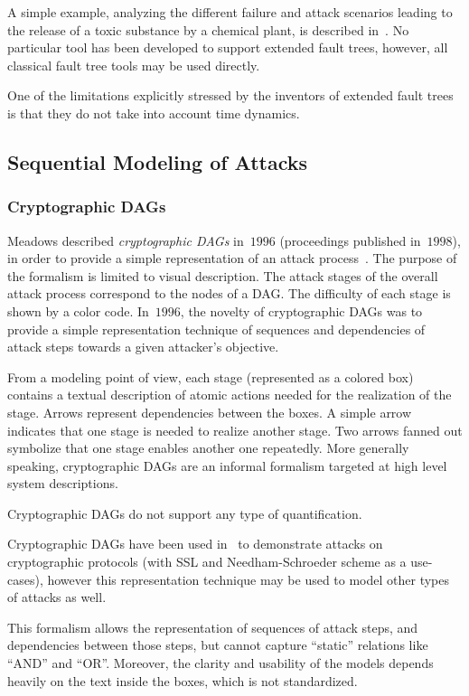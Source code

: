 \documentclass[a4paper]{article}
\begin{document}
A simple example, analyzing the different failure and attack scenarios leading
to the release of a toxic substance by a chemical plant, is described
in~\cite{FoMaCi}. No particular tool has been developed to support extended
fault trees, however, all classical fault tree tools may be used directly.

One of the limitations explicitly stressed by the inventors of extended fault
trees is that they do not take into account time dynamics. 

\subsection{Sequential Modeling of Attacks}
\label{sec:offensive_sequential}

\subsubsection{Cryptographic DAGs} 
\label{sec:cryptographic_dag}

Meadows described \emph{cryptographic DAGs} in~$1996$ (proceedings published
in~$1998$), in order to provide a simple representation of an attack
process~\cite{Mead2}. The purpose of the formalism is limited to visual
description. The attack stages of the overall attack process correspond to the
nodes of a DAG. The difficulty of each stage is shown by a color code.
In~$1996$, the novelty of cryptographic DAGs was to provide a simple
representation technique of sequences and dependencies of attack steps towards a
given attacker's objective.

From a modeling point of view, each stage (represented as a colored box)
contains a textual description of atomic actions needed for the realization
of the stage. Arrows represent dependencies between the boxes. A simple arrow 
indicates that one stage is needed to realize another stage. Two arrows fanned 
out symbolize that one stage enables another one repeatedly. More generally 
speaking, cryptographic DAGs are an informal formalism targeted at high level 
system descriptions.

Cryptographic DAGs do not support any type of quantification.

Cryptographic DAGs have been used in~\cite{Mead2} to demonstrate attacks on
cryptographic protocols (with SSL and Needham-Schroeder scheme as a use-cases),
however this representation technique may be used to model other types
of attacks as well.

This formalism allows the representation of sequences of attack steps, and
dependencies between those steps, but cannot capture ``static'' relations like
``AND'' and ``OR''. Moreover, the clarity and usability of the models depends
heavily on the text inside the boxes, which is not standardized.
\end{document}
